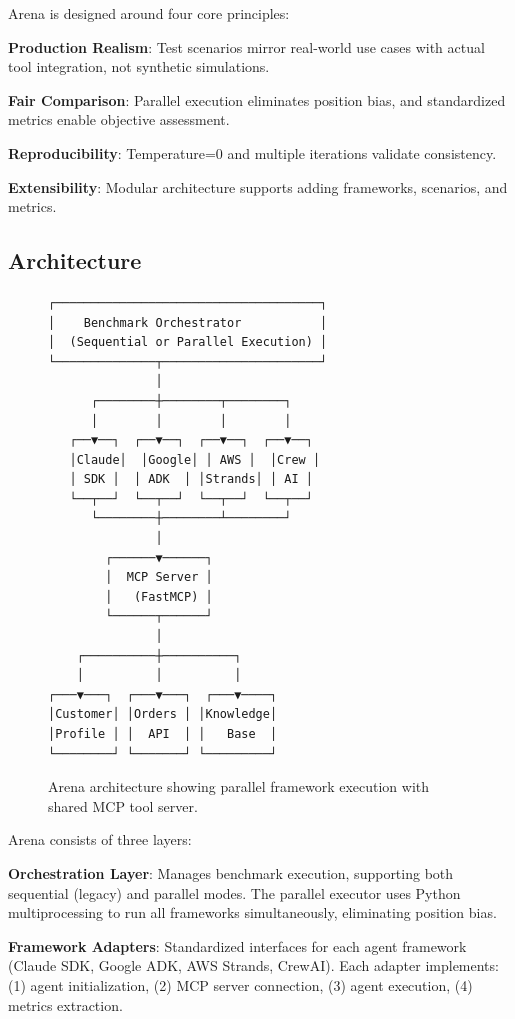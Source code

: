 \documentclass[sigconf,nonacm]{acmart}
\begin{document}
Arena is designed around four core principles:

\textbf{Production Realism}: Test scenarios mirror real-world use cases with actual tool integration, not synthetic simulations.

\textbf{Fair Comparison}: Parallel execution eliminates position bias, and standardized metrics enable objective assessment.

\textbf{Reproducibility}: Temperature=0 and multiple iterations validate consistency.

\textbf{Extensibility}: Modular architecture supports adding frameworks, scenarios, and metrics.

\subsection{Architecture}

\begin{figure}[h]
\centering
\begin{verbatim}
┌─────────────────────────────────────┐
│    Benchmark Orchestrator           │
│  (Sequential or Parallel Execution) │
└──────────────┬──────────────────────┘
               │
      ┌────────┼────────┬────────┐
      │        │        │        │
   ┌──▼──┐  ┌──▼──┐  ┌──▼──┐  ┌──▼──┐
   │Claude│  │Google│ │ AWS │  │Crew │
   │ SDK │  │ ADK  │ │Strands│ │ AI │
   └──┬──┘  └──┬──┘  └──┬──┘  └──┬──┘
      └────────┼────────┴────────┘
               │
        ┌──────▼──────┐
        │  MCP Server │
        │   (FastMCP) │
        └──────┬──────┘
               │
    ┌──────────┼──────────┐
    │          │          │
┌───▼───┐  ┌───▼───┐  ┌───▼────┐
│Customer│ │Orders │ │Knowledge│
│Profile │ │  API  │ │   Base  │
└────────┘ └───────┘ └─────────┘
\end{verbatim}
\caption{Arena architecture showing parallel framework execution with shared MCP tool server.}
\label{fig:architecture}
\end{figure}

Arena consists of three layers:

\textbf{Orchestration Layer}: Manages benchmark execution, supporting both sequential (legacy) and parallel modes. The parallel executor uses Python multiprocessing to run all frameworks simultaneously, eliminating position bias.

\textbf{Framework Adapters}: Standardized interfaces for each agent framework (Claude SDK, Google ADK, AWS Strands, CrewAI). Each adapter implements: (1) agent initialization, (2) MCP server connection, (3) agent execution, (4) metrics extraction.
\end{document}
